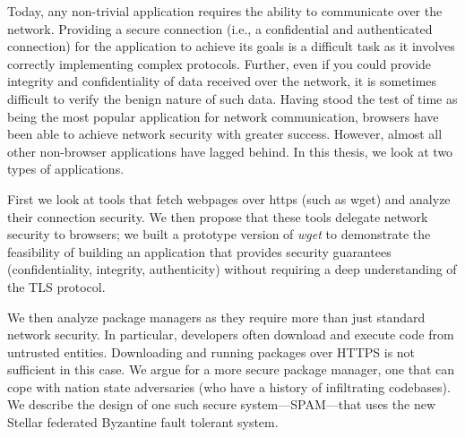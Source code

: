 Today, any non-trivial application requires the ability to communicate over the
network. Providing a secure connection (i.e., a confidential and authenticated
connection) for the application to achieve its goals is a difficult task as it
involves correctly implementing complex protocols. Further, even if you could
provide integrity and confidentiality of data received over the network, it is
sometimes difficult to verify the benign nature of such data. Having stood the
test of time as being the most popular application for network communication,
browsers have been able to achieve network security with greater success.
However, almost all other non-browser applications have lagged behind. In this
thesis, we look at two types of applications.

First we look at tools that fetch webpages over https (such as wget) and
analyze their connection security. We then propose that these tools delegate
network security to browsers; we built a prototype version of \emph{wget} to
demonstrate the feasibility of building an application that provides security
guarantees (confidentiality, integrity, authenticity) without requiring a deep
understanding of the TLS protocol.

We then analyze package managers as they require more than just standard
network security. In particular, developers often download and execute code
from untrusted entities. Downloading and running packages over HTTPS is not
sufficient in this case. We argue for a more secure package manager, one that
can cope with nation state adversaries (who have a history of infiltrating
codebases). We describe the design of one such secure system---SPAM---that uses
the new Stellar federated Byzantine fault tolerant system.
